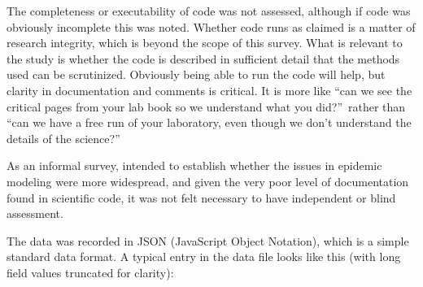 \documentclass[10pt,a4paper]{article}
\begin{document}
The completeness or executability of code was not assessed, although if code was obviously incomplete this was noted. Whether code runs as claimed is a matter of research integrity, which is beyond the scope of this survey. What is relevant to the study is whether the code is described in sufficient detail that the methods used can be scrutinized. Obviously being able to run the code will help, but clarity in documentation and comments is critical. It is more like ``can we see the critical pages from your lab book so we understand what you did?''\ rather than ``can we have a free run of your laboratory, even though we don't understand the details of the science?''

As an informal survey, intended to establish whether the issues in epidemic modeling were more widespread, and given the very poor level of documentation found in scientific code, it was not felt necessary to have independent or blind assessment.

The data was recorded in JSON (JavaScript Object Notation), which is a simple standard data format. A typical entry in the data file looks like this (with long field values truncated for clarity):
\end{document}
